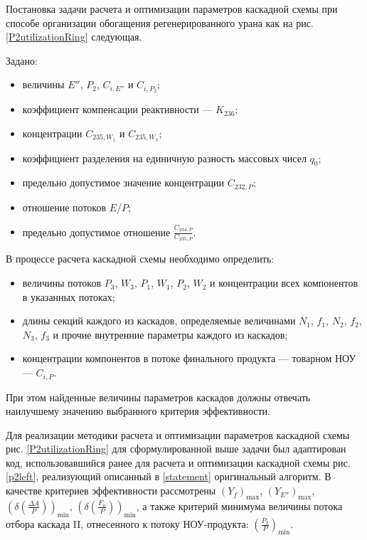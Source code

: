 Постановка задачи расчета и оптимизации параметров каскадной схемы при способе организации обогащения регенерированного урана как на рис. \ref{P2utilizationRing} следующая.

Задано:

\begin{itemize}
    \item величины $E''$, $P_2$, $C_{i,E''}$ и $C_{i,{P_2}}$; 
    \item коэффициент компенсации реактивности --- $K_{236}$;
    \item концентрации $C_{235,{W_1}}$ и $C_{235,{W_3}}$;
    \item коэффициент разделения на единичную разность массовых чисел $q_{0}$;
    \item предельно допустимое значение концентрации $C_{232,{P}}$;
    \item отношение потоков ${E}/P$;
    \item предельно допустимое отношение $\frac{C_{234,{P}}}{C_{235,{P}}}$. 
\end{itemize}

В процессе расчета каскадной схемы необходимо определить:

\begin{itemize}
    \item величины потоков $P_3$, $W_3$, $P_1$, $W_1$, $P_2$, $W_2$ и концентрации всех компонентов в указанных потоках; 
    \item длины секций каждого из каскадов, определяемые величинами $N_1$, $f_1$, $N_2$, $f_2$, $N_3$, $f_3$ и прочие внутренние параметры каждого из каскадов;
    \item концентрации компонентов в потоке финального продукта --- товарном НОУ --- $C_{i,P}$.
\end{itemize}

При этом найденные величины параметров каскадов должны отвечать наилучшему значению выбранного критерия эффективности.  

Для реализации методики расчета и оптимизации параметров каскадной схемы рис. \ref{P2utilizationRing} для сформулированной выше задачи был адаптирован код, использовавшийся ранее для расчета и оптимизации каскадной схемы рис. \ref{p2left}, реализующий описанный в \ref{statement} оригинальный алгоритм. В качестве критериев эффективности рассмотрены $(Y_f)_\text{max}$, $(Y_{E''})_\text{max}$, $(\delta(\frac{\Delta A}{P}))_\text{min}$, $(\delta(\frac{F_n}{P}))_\text{min}$, а также критерий минимума величины потока отбора каскада II, отнесенного к потоку НОУ-продукта:  $(\frac{P_2}{P})_\text{min}$.     


